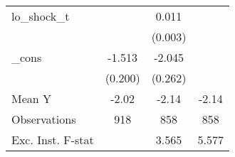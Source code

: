{\begin{tabular}{l*{3}{c}}
\addlinespace
lo\_shock\_t  &                     &       0.011\sym{***}&                     \\
            &                     &     (0.003)         &                     \\
\addlinespace
\_cons      &      -1.513\sym{***}&      -2.045\sym{***}&                     \\
            &     (0.200)         &     (0.262)         &                     \\
\midrule
Mean Y      &       -2.02         &       -2.14         &       -2.14         \\
Observations&         918         &         858         &         858         \\
Exc. Inst. F-stat&                     &       3.565         &       5.577         \\
\bottomrule
\end{tabular}
}
